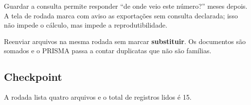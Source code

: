 \begin{nota}[Proveniência]
Guardar a consulta permite responder ``de onde veio este número?'' meses depois. A tela de rodada
marca com aviso as exportações sem consulta declarada; isso não impede o cálculo, mas impede a
reprodutibilidade.
\end{nota}

\begin{alerta}
Reenviar arquivos na mesma rodada sem marcar \textbf{substituir}. Os documentos são somados e o
PRISMA passa a contar duplicatas que não são famílias.
\end{alerta}

\subsection*{Checkpoint}
\marcador\; A rodada lista quatro arquivos e o total de registros lidos é \num{15}.
